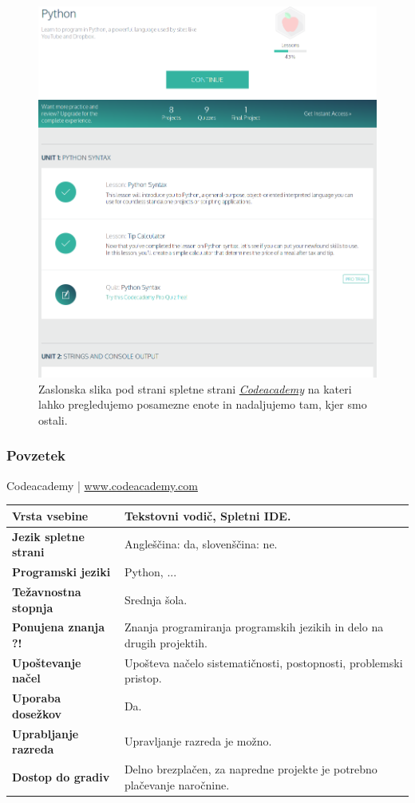 \begin{figure}[h!]
  \centering
    \includegraphics [width=0.65\linewidth, keepaspectratio =
    1] {./images/sc_web/codeacademy_tema_01.png}
    \caption{Zaslonska slika pod strani spletne strani
      \emph{\href{https://www.codecademy.com/}{Codeacademy}}
      \cite{web:codeacademy} na kateri lahko pregledujemo posamezne
      enote in nadaljujemo tam, kjer smo ostali.}
    \label{fig:scr:web:codeacademy:tema}
\end{figure}



\subsubsection{Povzetek}

\begin{osebnabox}[label={osebna:codeacademy}]{Codeacademy | \url{www.codeacademy.com}}
    \begin{tabular}{
  p{} |
  p{}  }
  \textbf{Vrsta vsebine} & Tekstovni vodič, Spletni IDE. \\
      \hline
  \textbf{Jezik spletne strani} &  Angleščina: da, slovenščina: ne. \\
      \hline
  \textbf{Programski jeziki} & Python, ... \\
      \hline
  \textbf{Težavnostna stopnja} & Srednja šola. \\
      \hline
  \textbf{Ponujena znanja ?!} & Znanja programiranja programskih jezikih
      in delo na drugih projektih. \\
      \hline
  \textbf{Upoštevanje načel} & Upošteva načelo sistematičnosti,
      postopnosti, problemski pristop. \\
      \hline
  \textbf{Uporaba dosežkov} & Da. \\
      \hline
  \textbf{Uprabljanje razreda} & Upravljanje razreda je možno. \\
      \hline
  \textbf{Dostop do gradiv} & Delno brezplačen, za napredne projekte je
      potrebno plačevanje naročnine. \\
\end{tabular}
\end{osebnabox}

